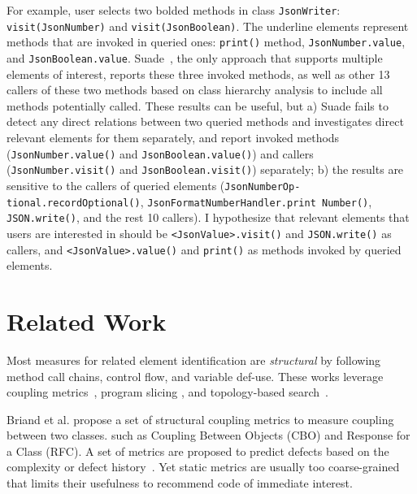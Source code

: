 \documentclass{sig-alternate}
\newcommand{\codefont}[1]{\footnotesize{\texttt{#1}}\normalsize}
\begin{document}

For example, user selects two bolded methods in class \codefont{JsonWriter}:  \codefont{visit(JsonNumber)} and \codefont{visit(JsonBoolean)}. The underline elements represent methods that are invoked in queried ones: \codefont{print()} method, \codefont{JsonNumber.value}, and \codefont{JsonBoolean.value}. Suade~\cite{Robillard:FSE05}, the only approach that supports multiple elements of interest, reports these three invoked methods, as well as other 13 callers of these two methods based on class hierarchy analysis to include all methods potentially called. These results can be useful, but a) Suade fails to detect any direct relations between two queried methods and investigates direct relevant elements for them separately, and report invoked methods (\codefont{JsonNumber.value()} and \codefont{JsonBoolean.value()}) and callers (\codefont{JsonNumber.visit()} and \codefont{JsonBoolean.visit()}) separately; b) the results are sensitive to the callers of queried elements (\codefont{JsonNumberOp- tional.recordOptional()}, \codefont{JsonFormatNumberHandler.print Number()}, \codefont{JSON.write()}, and the rest 10 callers). I hypothesize that relevant elements that users are interested in should be \codefont{<JsonValue>.visit()} and \codefont{JSON.write()} as callers, and \codefont{<JsonValue>.value()}  and \codefont{print()} as methods invoked by queried elements. 



\section{Related Work}


Most measures for related element identification are {\em structural} by following method call chains, control flow, and variable def-use. These works leverage coupling metrics~\cite{Briand:structural99}, program slicing \cite{Bodik:slicePLSI07}, and topology-based search~\cite{Robillard:FSE05, Zimmermann:ICSE08}. 


 Briand et al.\/ propose a set of structural coupling metrics to measure coupling between two classes. such as Coupling Between Objects (CBO) and Response for a Class (RFC). A set of metrics are proposed to predict defects based on the complexity or defect history~\cite{Gyimothy:metrics05, Nagappan:ICSE06}. Yet static metrics are usually too coarse-grained that limits their usefulness to recommend code of immediate interest.
\end{document}

